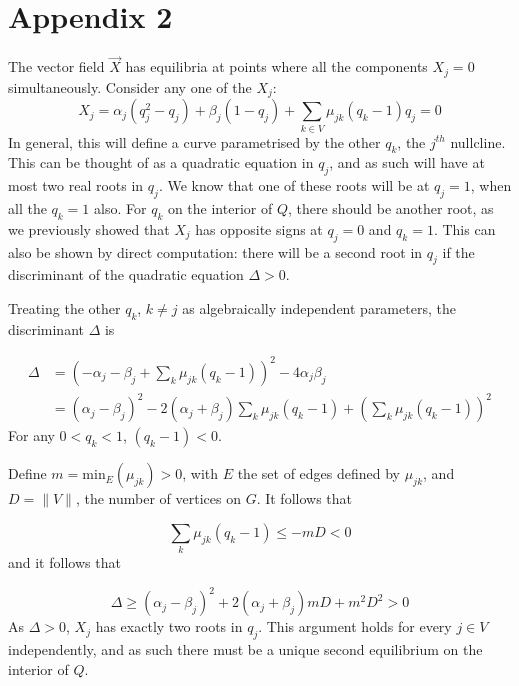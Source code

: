 \documentclass{article}
\begin{document}
\section{Appendix 2}

The vector field $\vec{X}$ has equilibria at points where all the components
$X_j = 0$ simultaneously. Consider any one of the $X_j$:
\begin{equation}
    X_j = \alpha_j (q_j^2 - q_j) + \beta_j (1 - q_j) 
          + \sum_{k \in V} \mu_{jk} (q_k - 1) q_j = 0
\end{equation}
In general, this will define a curve parametrised by the other $q_k$, the
$j^{th}$ nullcline.
This can be thought of as a quadratic equation in $q_j$, and as such will have
at most two real roots in $q_j$. We know that one of these roots will be at $q_j
= 1$, when all the $q_k = 1$ also. For $q_k$ on the interior of $Q$, there
should be another root, as we previously showed that $X_j$ has opposite signs at
$q_j = 0$ and $q_k = 1$. This can also be shown by direct computation: there
will be a second root in $q_j$ if the discriminant of the quadratic equation $\Delta > 0$.

Treating the other $q_k$, $k \neq j$ as algebraically independent parameters,
the discriminant $\Delta$ is

\begin{align}
    \Delta &= (-\alpha_j -\beta_j + \sum_k \mu_{jk} (q_k - 1))^2 - 4\alpha_j \beta_j
    \nonumber \\
    &= (\alpha_j - \beta_j)^2 - 2 (\alpha_j + \beta_j) \sum_k \mu_{jk} (q_k - 1)
    +(\sum_k \mu_{jk} (q_k - 1))^2
\end{align}
For any $0 < q_k < 1$, $(q_k - 1) < 0$.

Define $m = \mathrm{min}_E(\mu_{jk}) > 0$, with $E$ the set of edges defined by
$\mu_{jk}$, and $D = \|V\|$, the number of vertices on $G$. It follows that

\begin{equation}
    \sum_k \mu_{jk} (q_k - 1) \leq - m D < 0
\end{equation}
and it follows that

\begin{equation}
    \Delta \geq (\alpha_j - \beta_j)^2 + 2 (\alpha_j + \beta_j) m D + m^2 D^2 > 0
\end{equation}
As $\Delta > 0$, $X_j$ has exactly two roots in $q_j$. This argument holds for every
$j \in V$ independently, and as such there must be a unique second equilibrium on the
interior of $Q$.
\end{document}

